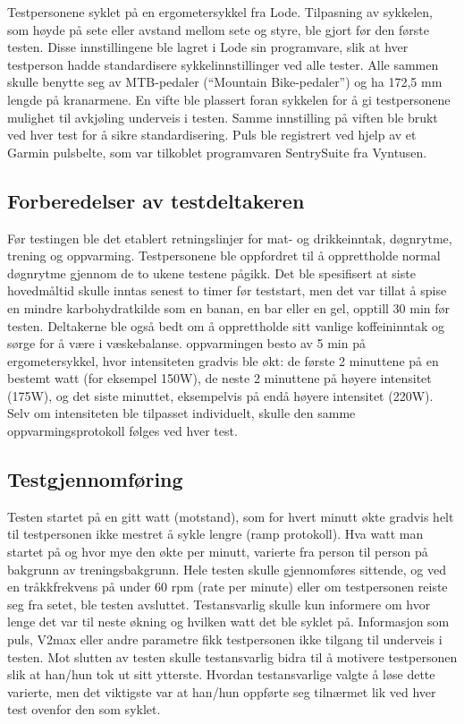 \documentclass[
  letterpaper,
  DIV=11,
  numbers=noendperiod]{scrreprt}
\begin{document}
Testpersonene syklet på en ergometersykkel fra Lode. Tilpasning av
sykkelen, som høyde på sete eller avstand mellom sete og styre, ble
gjort før den første testen. Disse innstillingene ble lagret i Lode sin
programvare, slik at hver testperson hadde standardisere
sykkelinnstillinger ved alle tester. Alle sammen skulle benytte seg av
MTB-pedaler (``Mountain Bike-pedaler'') og ha 172,5 mm lengde på
kranarmene. En vifte ble plassert foran sykkelen for å gi testpersonene
mulighet til avkjøling underveis i testen. Samme innstilling på viften
ble brukt ved hver test for å sikre standardisering. Puls ble registrert
ved hjelp av et Garmin pulsbelte, som var tilkoblet programvaren
SentrySuite fra Vyntusen.

\subsection{Forberedelser av
testdeltakeren}\label{forberedelser-av-testdeltakeren}

Før testingen ble det etablert retningslinjer for mat- og drikkeinntak,
døgnrytme, trening og oppvarming. Testpersonene ble oppfordret til å
opprettholde normal døgnrytme gjennom de to ukene testene pågikk. Det
ble spesifisert at siste hovedmåltid skulle inntas senest to timer før
teststart, men det var tillat å spise en mindre karbohydratkilde som en
banan, en bar eller en gel, opptill 30 min før testen. Deltakerne ble
også bedt om å opprettholde sitt vanlige koffeininntak og sørge for å
være i væskebalanse. oppvarmingen besto av 5 min på ergometersykkel,
hvor intensiteten gradvis ble økt: de første 2 minuttene på en bestemt
watt (for eksempel 150W), de neste 2 minuttene på høyere intensitet
(175W), og det siste minuttet, eksempelvis på endå høyere intensitet
(220W). Selv om intensiteten ble tilpasset individuelt, skulle den samme
oppvarmingsprotokoll følges ved hver test.

\subsection{Testgjennomføring}\label{testgjennomfuxf8ring}

Testen startet på en gitt watt (motstand), som for hvert minutt økte
gradvis helt til testpersonen ikke mestret å sykle lengre (ramp
protokoll). Hva watt man startet på og hvor mye den økte per minutt,
varierte fra person til person på bakgrunn av treningsbakgrunn. Hele
testen skulle gjennomføres sittende, og ved en tråkkfrekvens på under 60
rpm (rate per minute) eller om testpersonen reiste seg fra setet, ble
testen avsluttet. Testansvarlig skulle kun informere om hvor lenge det
var til neste økning og hvilken watt det ble syklet på. Informasjon som
puls, V2max eller andre parametre fikk testpersonen ikke tilgang til
underveis i testen. Mot slutten av testen skulle testansvarlig bidra til
å motivere testpersonen slik at han/hun tok ut sitt ytterste. Hvordan
testansvarlige valgte å løse dette varierte, men det viktigste var at
han/hun oppførte seg tilnærmet lik ved hver test ovenfor den som syklet.
\end{document}
